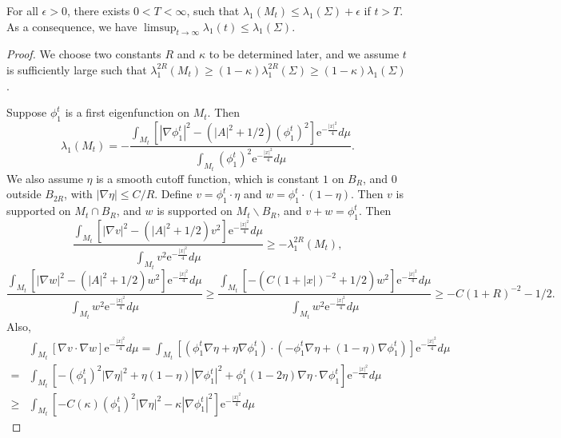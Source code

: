 \documentclass[10pt,a4paper]{amsart}
\begin{document}
	\begin{lemma}\label{lem:eigenconverge-2}
		For all $\epsilon>0$, there exists $0<T<\infty$, such that $\lambda_1(M_t)\leq\lambda_1(\Sigma)+\epsilon$ if $t>T$.
		As a consequence, we have 
		$\limsup_{t\to\infty}\lambda_1(t)\leq \lambda_1(\Sigma).$\end{lemma}

	\begin{proof}
		We choose two constants $R$ and $\kappa$ to be determined later, and we assume $t$ is sufficiently large such that $\lambda_1^{2R}(M_t)\geq (1-\kappa)\lambda_1^{2R}(\Sigma)\geq (1-\kappa)\lambda_1(\Sigma)$.
		
		Suppose $\phi_1^t$ is a first eigenfunction on $M_t$. Then
		\[\lambda_1(M_t)=-\frac{\int_{M_t}[|\nabla \phi_1^t|^2 -(|A|^2+1/2)(\phi_1^t)^2]\mathrm{e}^{-\frac{|x|^2}{4}}d\mu}{\int_{M_t}(\phi_1^t)^2\mathrm{e}^{-\frac{|x|^2}{4}}d\mu}.
		\]
		We also assume $\eta$ is a smooth cutoff function, which is constant $1$ on $B_R$, and $0$ outside $B_{2R}$, with $|\nabla \eta|\leq C/R$. Define $v=\phi_1^t \cdot\eta$ and $w=\phi_1^t\cdot(1-\eta)$. Then $v$ is supported on $M_t\cap B_R $, and $w$ is supported on $M_t\backslash B_R$, and $v+w=\phi_1^t$. Then
		\[
		\frac{\int_{M_t}[|\nabla v|^2 -(|A|^2+1/2)v^2]\mathrm{e}^{-\frac{|x|^2}{4}}d\mu}{\int_{M_t}v^2\mathrm{e}^{-\frac{|x|^2}{4}}d\mu} \geq -\lambda_1^{2R}(M_t),
		\]
		\[
		\frac{\int_{M_t}[|\nabla w|^2 -(|A|^2+1/2)w^2]\mathrm{e}^{-\frac{|x|^2}{4}}d\mu}{\int_{M_t}w^2\mathrm{e}^{-\frac{|x|^2}{4}}d\mu}
		\geq 	\frac{\int_{M_t}[ -(C(1+|x|)^{-2}+1/2)w^2]\mathrm{e}^{-\frac{|x|^2}{4}}d\mu}{\int_{M_t}w^2\mathrm{e}^{-\frac{|x|^2}{4}}d\mu}
		\geq -C(1+R)^{-2}-1/2.
		\]
		Also, \begin{equation}\label{eq:eigenconverge1}
			\begin{split}
				&\int_{M_t}[\nabla v\cdot\nabla w] \mathrm{e}^{-\frac{|x|^2}{4}}d\mu
				=
				\int_{M_t}[(\phi_1^t\nabla \eta+\eta\nabla \phi_1^t)\cdot(-\phi_1^t\nabla\eta+(1-\eta)\nabla \phi_1^t)] \mathrm{e}^{-\frac{|x|^2}{4}}d\mu
				\\
				=&
				\int_{M_t}[-(\phi_1^t)^2|\nabla\eta|^2 +\eta(1-\eta)|\nabla \phi_1^t|^2
				+\phi_1^t(1-2\eta)\nabla\eta\cdot\nabla\phi_1^t] \mathrm{e}^{-\frac{|x|^2}{4}}d\mu
				\\
				\geq &
				\int_{M_t}[-C(\kappa)(\phi_1^t)^2|\nabla\eta|^2-\kappa|\nabla \phi_1^t|^2] \mathrm{e}^{-\frac{|x|^2}{4}}d\mu
			\end{split}
		\end{equation}
		\begin{equation}

\end{equation}
\end{proof}
\end{document}
